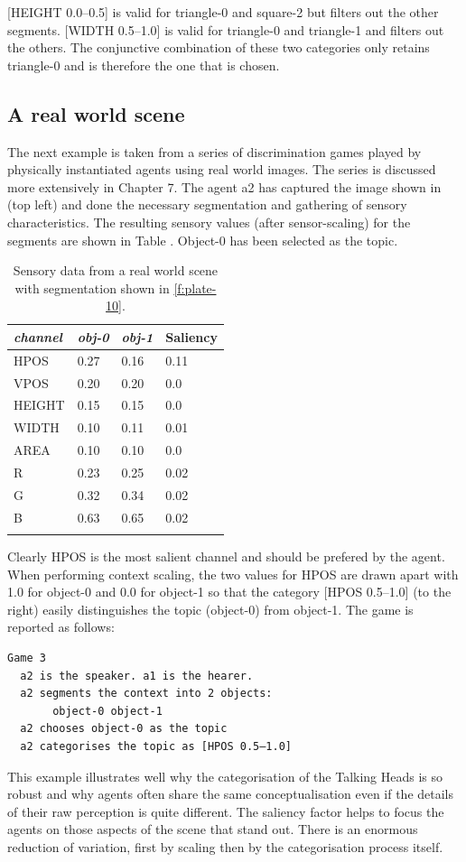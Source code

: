 [HEIGHT 0.0–0.5] is valid for triangle-0 and square-2 but
filters out the other segments. 
[WIDTH 0.5–1.0] is valid for triangle-0 and triangle-1 and 
filters out the others.  
The conjunctive combination of these two categories only 
retains triangle-0 and is therefore the one that is chosen. 

\subsection{A real world scene}

The next example is taken from a series of discrimination 
games played by physically instantiated agents using 
real world images. The series is discussed more extensively 
in Chapter 7. The agent {\bfshape a2} has 
captured the image shown in 
(top left) and done the necessary segmentation and 
gathering of sensory characteristics. The resulting sensory
values (after sensor-scaling) for the segments are shown
in Table . Object-0 has been selected as the topic. 

\begin{table}
\begin{center}
\begin{tabular}{ l  l  l  l }
\lsptoprule
{\itshape channel}& {\itshape obj-0} & {\itshape obj-1} & Saliency\\ \midrule
HPOS & 0.27 & 0.16 & 0.11\\ 
VPOS & 0.20 & 0.20 & 0.0\\ 
HEIGHT & 0.15 & 0.15 & 0.0\\ 
WIDTH & 0.10 & 0.11 & 0.01\\ 
AREA & 0.10 & 0.10 & 0.0\\ 
R & 0.23 & 0.25 & 0.02\\ 
G & 0.32 & 0.34  & 0.02\\ 
B & 0.63 & 0.65 & 0.02\\ 
\lspbottomrule
\end{tabular}
\caption{\label{tab:t-real}Sensory data from a real world scene with segmentation shown in \ref{f:plate-10}.}
\end{center}
\end{table}
Clearly HPOS is the most salient channel and should be 
prefered by the agent. When performing context scaling, 
the two values for HPOS are drawn apart with 1.0 for object-0 and 
0.0 for object-1 so that the category [HPOS 0.5–1.0] (to the 
right) easily distinguishes the topic (object-0) from
object-1. The game is reported as follows: 
\begin{verbatim}
Game 3 
  a2 is the speaker. a1 is the hearer. 
  a2 segments the context into 2 objects: 
       object-0 object-1
  a2 chooses object-0 as the topic 
  a2 categorises the topic as [HPOS 0.5–1.0]
\end{verbatim}
This example illustrates well why the categorisation 
of the Talking Heads is so robust and why agents 
often share the same conceptualisation even if the details  
of their raw perception is quite different. 
The saliency factor helps to focus the agents on those
aspects of the scene that stand out. There is 
an enormous reduction of variation, first by scaling then by 
the categorisation process itself. 

